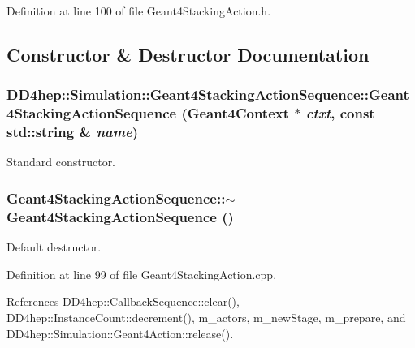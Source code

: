 Definition at line 100 of file Geant4StackingAction.h.

\subsection{Constructor \& Destructor Documentation}
\hypertarget{class_d_d4hep_1_1_simulation_1_1_geant4_stacking_action_sequence_a1ddc69cd00ed31d6da76929243f43c84}{
\subsubsection[{Geant4StackingActionSequence}]{\setlength{\rightskip}{0pt plus 5cm}DD4hep::Simulation::Geant4StackingActionSequence::Geant4StackingActionSequence ({\bf Geant4Context} $\ast$ {\em ctxt}, \/  const std::string \& {\em name})}}
\label{class_d_d4hep_1_1_simulation_1_1_geant4_stacking_action_sequence_a1ddc69cd00ed31d6da76929243f43c84}


Standard constructor. \hypertarget{class_d_d4hep_1_1_simulation_1_1_geant4_stacking_action_sequence_af4cadf550f682910d7eee326802859d8}{
\subsubsection[{$\sim$Geant4StackingActionSequence}]{\setlength{\rightskip}{0pt plus 5cm}Geant4StackingActionSequence::$\sim$Geant4StackingActionSequence ()}}
\label{class_d_d4hep_1_1_simulation_1_1_geant4_stacking_action_sequence_af4cadf550f682910d7eee326802859d8}


Default destructor. 

Definition at line 99 of file Geant4StackingAction.cpp.

References DD4hep::CallbackSequence::clear(), DD4hep::InstanceCount::decrement(), m\_\-actors, m\_\-newStage, m\_\-prepare, and DD4hep::Simulation::Geant4Action::release().

